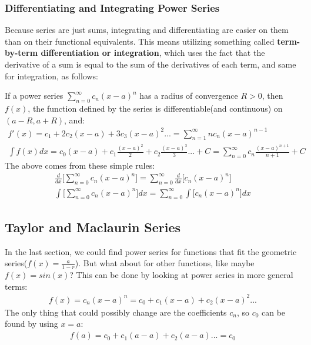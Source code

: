 \documentclass{article}
\begin{document}
\subsubsection{Differentiating and Integrating Power Series}
Because series are just sums, integrating and differentiating are easier on them than on their functional equivalents. This means utilizing something called \textbf{term-by-term differentiation or integration}, which uses the fact that the derivative of a sum is equal to the sum of the derivatives of each term, and same for integration, as follows:

If a power series $\sum_{n=0}^\infty c_n (x-a)^n$ has a radius of convergence $R > 0$, then $f(x)$, the function defined by the series is differentiable(and continuous) on $(a-R, a+R)$, and:
\begin{gather*}
    f'(x) = c_1 + 2c_2(x-a) + 3c_3(x-a)^2... = \sum_{n=1}^\infty nc_n(x-a)^{n-1}\\
    \int f(x) dx = c_0(x-a) + c_1\frac{(x-a)^2}{2} + c_2\frac{(x-a)^3}{3}...+C = \sum_{n=0}^\infty c_n \frac{(x-a)^{n+1}}{n+1} + C
\end{gather*}
The above comes from these simple rules:
\begin{gather}
    \frac{d}{dx} \bigg[\sum_{n=0}^\infty c_n(x-a)^n\bigg] = \sum_{n=0}^\infty \frac{d}{dx} \big[c_n(x-a)^n\big]\\
    \int \bigg[\sum_{n=0}^\infty c_n(x-a)^n\bigg] dx= \sum_{n=0}^\infty \int \big[c_n(x-a)^n\big] dx
\end{gather}
\subsection{Taylor and Maclaurin Series}
In the last section, we could find power series for functions that fit the geometric series($f(x) = \frac{a}{1-r}$). But what about for other functions, like maybe $f(x) = sin(x)$? This can be done by looking at power series in more general terms:
\begin{gather*}
    f(x) = c_n (x-a)^n = c_0 + c_1 (x-a) + c_2 (x-a)^2...
\end{gather*}
The only thing that could possibly change are the coefficients $c_n$, so $c_0$ can be found by using $x = a$:
\begin{gather*}
    f(a) = c_0 + c_1(a-a) + c_2(a-a)... = c_0
\end{gather*}
\end{document}

